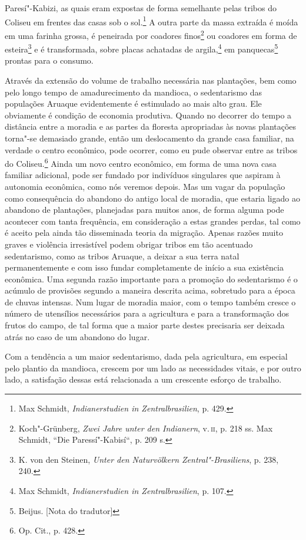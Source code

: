Paresí"-Kabizi, as quais eram expostas de forma semelhante pelas tribos
do Coliseu em frentes das casas sob o sol.\footnote{Max Schmidt,
  \emph{Indianerstudien in Zentralbrasilien}, p. 429.} A outra parte da
massa extraída é moída em uma farinha grossa, é peneirada por coadores
finos\footnote{Koch"-Grünberg, \emph{Zwei Jahre unter den Indianern}, v.\,\textsc{ii}, p. 218 ss. Max Schmidt, ``Die Paressí"-Kabisí``, p. 209 s.} ou
coadores em forma de esteira\footnote{K. von den Steinen, \emph{Unter
  den Naturvölkern Zentral"-Brasiliens}, p. 238, 240.} e é transformada,
sobre placas achatadas de argila,\footnote{Max Schmidt,
  \emph{Indianerstudien in Zentralbrasilien}, p. 107.} em panquecas\footnote[*]{Beijus. {[}Nota do tradutor{]}}
 prontas para o consumo.

Através da extensão do volume de trabalho necessária nas plantações, bem
como pelo longo tempo de amadurecimento da mandioca, o sedentarismo das
populações Aruaque evidentemente é estimulado ao mais alto grau. Ele
obviamente é condição de economia produtiva. Quando no decorrer do
tempo a distância entre a moradia e as partes da floresta apropriadas às
novas plantações torna"-se demasiado grande, então um deslocamento da
grande casa familiar, na verdade o centro econômico, pode ocorrer, como
eu pude observar entre as tribos do Coliseu.\footnote{Op. Cit., p. 428.}
Ainda um novo centro econômico, em forma de uma nova casa familiar
adicional, pode ser fundado por indivíduos singulares que aspiram à
autonomia econômica, como nós veremos depois. Mas um vagar da população
como consequência do abandono do antigo local de moradia, que estaria
ligado ao abandono de plantações, planejadas para muitos anos, de forma
alguma pode acontecer com tanta frequência, em consideração a estas
grandes perdas, tal como é aceito pela ainda tão disseminada teoria da
migração. Apenas razões muito graves e violência irresistível podem
obrigar tribos em tão acentuado sedentarismo, como as tribos Aruaque, a
deixar a sua terra natal permanentemente e com isso fundar
completamente de início a sua existência econômica. Uma segunda razão
importante para a promoção do sedentarismo é o acúmulo de provisões
segundo a maneira descrita acima, sobretudo para a época de chuvas
intensas. Num lugar de moradia maior, com o tempo também cresce o
número de utensílios necessários para a agricultura e para a
transformação dos frutos do campo, de tal forma que a maior parte destes
precisaria ser deixada atrás no caso de um abandono do lugar.

Com a tendência a um maior sedentarismo, dada pela agricultura, em
especial pelo plantio da mandioca, crescem por um lado as necessidades
vitais, e por outro lado, a satisfação dessas está relacionada a um
crescente esforço de trabalho.

